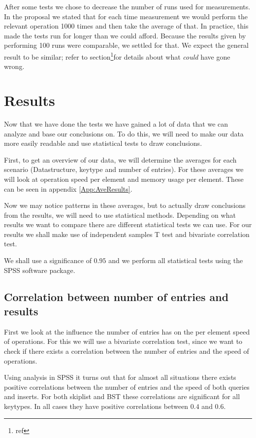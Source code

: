 \documentclass[12pt,a4paper]{article}
\begin{document}
    After some tests we chose to decrease the number of runs used for measurements.  In the proposal
    we stated that for each time measurement we would perform the relevant operation 1000 times and
    then take the average of that.  In practice, this made the tests run for longer than we could
    afford. Because the results given by performing 100 runs were comparable, we settled for that.
    We expect the general result to be similar; refer to section\footnote{ref}for details about what
    \emph{could} have gone wrong.


    \section{Results}

    Now that we have done the tests we have gained a lot of data that we can analyze and base our 
    conclusions on. To do this, we will need to make our data more easily readable and use statistical
    tests to draw conclusions.

     First, to get an overview of our data, we will determine the averages for each scenario
    (Datastructure, keytype and number of entries). For these averages we will look at operation speed per
    element and memory usage per element. These can be seen in appendix \ref{App:AveResults}.

    Now we may notice patterns in these averages, but to actually draw conclusions from the results, we will
    need to use statistical methods. Depending on what results we want to compare there are different statistical
    tests we can use. For our results we shall make use of independent samples T test and bivariate correlation test.

    We shall use a significance of $0.95$ and we perform all statistical tests using the SPSS software package.

    \subsection{Correlation between number of entries and results}
    First we look at the influence the number of entries has on the per element speed of operations. For this
    we will use a bivariate correlation test, since we want to check if there exists a correlation between 
    the number of entries and the speed of operations.

    Using analysis in SPSS it turns out that for almost all situations there exists positive correlations between the number
    of entries and the speed of both queries and inserts. For both skiplist and BST these correlations are significant for all
    keytypes. In all cases they have positive correlations between $0.4$ and $0.6$. 
\end{document}
